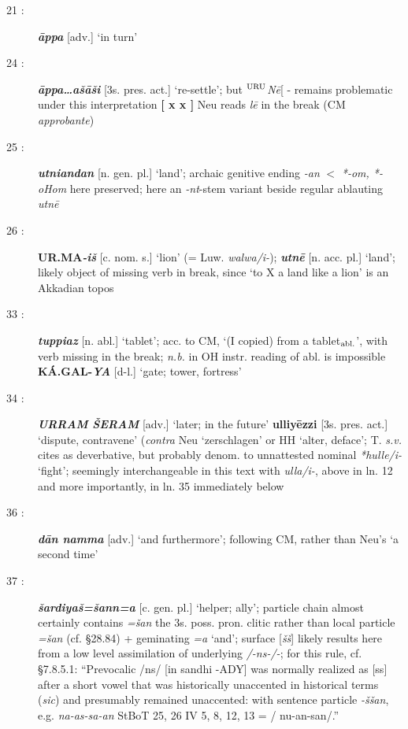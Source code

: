 \documentclass[10pt]{article}
\newcommand{\supersc}[1]{$^{\textrm{\scriptsize{#1}}}$}  	%
\newcommand{\subsc}[1]{$_{\textrm{\scriptsize{#1}}}$}	%
\newcommand{\bit}[1]{\textbf{\textit{#1}}}				%
\newcommand{\p}[1]{{\tiny[{#1}]}}					%
\newcommand{\hith}{\textsubwedge{h}}
\newcommand{\Hith}{\textsubwedge{H}}
\newcommand{\city}{\supersc{URU}}
\renewcommand{\.}[1]{\textsubdot{#1}}
\begin{document}
\begin{description}
\item[21 :] \bit{ \=appa} \p{adv.} `in turn'

\item[24 :] \bit{\=appa{\ldots}a\v{s}\=a\v{s}i} \p{3s. pres. act.} `re-settle'; but {\city}\textit{N\=e}[ - remains problematic under this interpretation \textbf{[ x x ]} Neu reads \textit{l\=e} in the break (CM \textit{approbante})

\item[25 :] \bit{utniandan} \p{n. gen. pl.} `land'; archaic genitive ending \textit{-an} $<$ \textit{*-om, *-oHom} here preserved; here an \textit{-nt}-stem variant beside regular ablauting \textit{utn\=e}

\item[26 :] \textbf{UR.MA{\Hith}}\bit{-i\v{s}} \p{c. nom. s.} `lion' (= Luw. \textit{walwa/i-}); \bit{utn\=e} \p{n. acc. pl.} `land'; likely object of missing verb in break, since `to X a land like a lion' is an Akkadian topos

\item[33 :] \bit{tuppiaz} \p{n. abl.} `tablet'; acc. to CM, `(I copied) from a tablet\subsc{abl.}', with verb missing in the break; \textit{n.b.} in OH instr. reading of abl. is impossible \textbf{K\'A.GAL-\textit{YA}} \p{d-l.} `gate; tower, fortress'

\item[34 :] \bit{URRAM \v{S}ERAM} \p{adv.} `later; in the future' \textbf{{\hith}ulliy\=ezzi} \p{3s. pres. act.} `dispute, contravene' (\textit{contra} Neu `zerschlagen' or HH `alter, deface'; T. \textit{s.v.} cites as deverbative, but probably denom. to unnattested nominal \textit{*hulle/i-} `fight'; seemingly interchangeable in this text with \textit{{\hith}ulla/i-}, above in ln. 12 and more importantly, in ln. 35 immediately below

\item[36 :] \bit{d\=an namma} \p{adv.} `and furthermore'; following CM, rather than Neu's `a second time'

\item[37 :] \bit{\v{s}ardiya\v{s}=\v{s}ann=a} \p{c. gen. pl.} `helper; ally'; particle chain almost certainly contains \textit{=\v{s}an} the 3s. poss. pron. clitic rather than local particle \textit{=\v{s}an} (cf.  \S28.84) + geminating \textit{=a} `and';  surface [\textit{\v{s}\v{s}}] likely results here from a low level assimilation of underlying \textit{/-ns-/-}; for this rule, cf. \citet{kimball1999hhp} \S7.8.5.1: ``Prevocalic /ns/ [in sandhi -ADY] was normally realized as [ss] after a short vowel that was historically unaccented in historical terms (\textit{sic}) and presumably remained unaccented: with sentence particle \textit{-\v{s}\v{s}an}, e.g. \textit{na-as-sa-an} StBoT 25, 26 IV 5, 8, 12, 13 = / nu-an-san/.''


\end{description}
\end{document}
